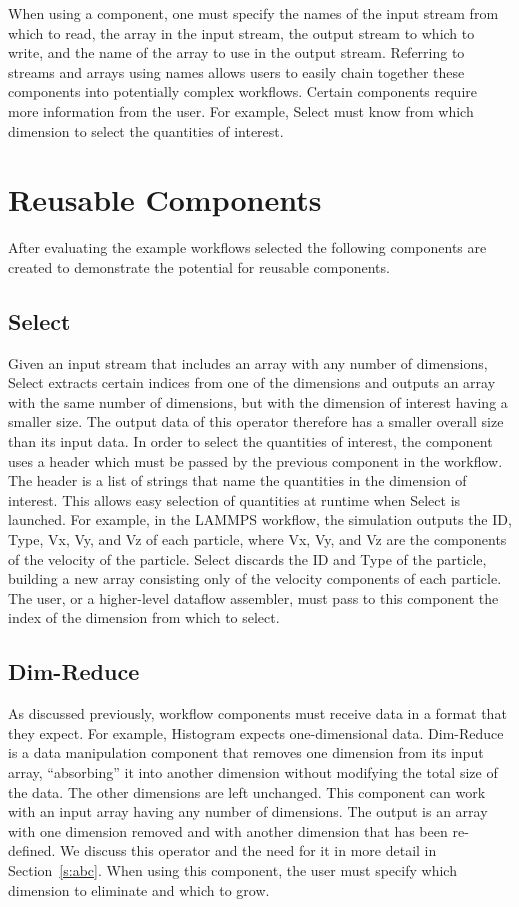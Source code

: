\documentclass[conference]{IEEEtran}
\begin{document}
When using a component, one must specify the names of the input stream from
which to read, the array in the input stream, the output stream to which to
write, and the name of the array to use in the output stream. Referring to
streams and arrays using names allows users to easily chain together these
components into potentially complex workflows. Certain components require more
information from the user. For example, Select must know from which dimension
to select the quantities of interest.

\section{Reusable Components}
\label{s:reusable-components}

After evaluating the example workflows selected the following components are
created to demonstrate the potential for reusable components.

\subsection{Select}

Given an input stream that includes an array with any number of dimensions,
Select extracts certain indices from one of the dimensions and outputs an array
with the same number of dimensions, but with the dimension of interest having a
smaller size. The output data of this operator therefore has a smaller overall
size than its input data. In order to select the quantities of interest, the
component uses a header which must be passed by the previous component in the
workflow. The header is a list of strings that name the quantities in the
dimension of interest. This allows easy selection of quantities at runtime when
Select is launched. For example, in the LAMMPS workflow, the simulation outputs
the ID, Type, Vx, Vy, and Vz of each particle, where Vx, Vy, and Vz are the
components of the velocity of the particle. Select discards the ID and Type of
the particle, building a new array consisting only of the velocity components
of each particle. The user, or a higher-level dataflow assembler, must pass to
this component the index of the dimension from which to select.

\subsection{Dim-Reduce}

As discussed previously, workflow components must receive data in a format
that they expect. For example, Histogram expects one-dimensional data.
Dim-Reduce is a data manipulation component that removes one dimension from its
input array, ``absorbing'' it into another dimension without modifying the
total size of the data. The other dimensions are left unchanged. This component
can work with an input array having any number of dimensions. The output is an
array with one dimension removed and with another dimension that has been
re-defined. We discuss this operator and the need for it in more detail in
Section~\ref{s:abc}. When using this component, the user must specify which
dimension to eliminate and which to grow.
\end{document}
